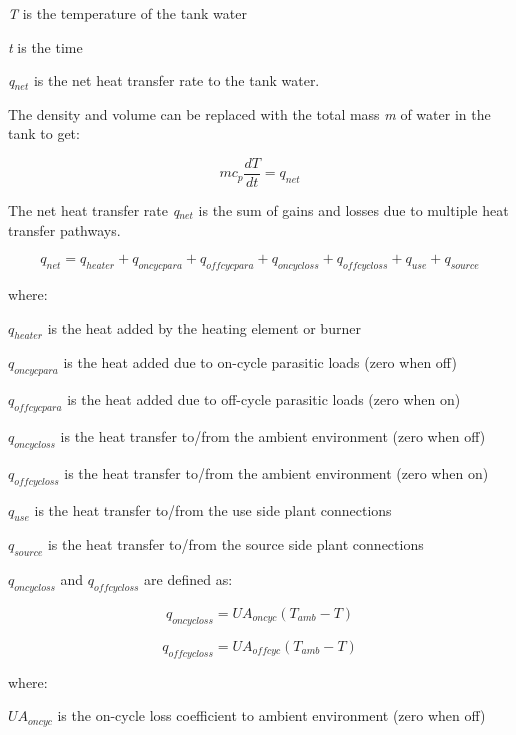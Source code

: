 \emph{T} is the temperature of the tank water

\emph{t} is the time

\emph{q\(_{net}\)} is the net heat transfer rate to the tank water.

The density and volume can be replaced with the total mass \emph{m} of water in the tank to get:

\begin{equation}
m{c_p}\frac{{dT}}{{dt}} = {q_{net}}
\end{equation}

The net heat transfer rate \emph{q\(_{net}\)} is the sum of gains and losses due to multiple heat transfer pathways.

\begin{equation}
{q_{net}} = {q_{heater}} + {q_{oncycpara}} + {q_{offcycpara}} + {q_{oncycloss}} + {q_{offcycloss}} + {q_{use}} + {q_{source}}
\end{equation}

where:

\(q_{heater}\) is the heat added by the heating element or burner

\(q_{oncycpara}\) is the heat added due to on-cycle parasitic loads (zero when off)

\(q_{offcycpara}\) is the heat added due to off-cycle parasitic loads (zero when on)

\(q_{oncycloss}\) is the heat transfer to/from the ambient environment (zero when off)

\(q_{offcycloss}\) is the heat transfer to/from the ambient environment (zero when on)

\(q_{use}\) is the heat transfer to/from the use side plant connections

\(q_{source}\) is the heat transfer to/from the source side plant connections

\(q_{oncycloss}\) and \(q_{offcycloss}\) are defined as:

\begin{equation}
{q_{oncycloss}} = U{A_{oncyc}}\left( {{T_{amb}} - T} \right)
\end{equation}

\begin{equation}
{q_{offcycloss}} = U{A_{offcyc}}\left( {{T_{amb}} - T} \right)
\end{equation}

where:

\(UA_{oncyc}\) is the on-cycle loss coefficient to ambient environment (zero when off)

